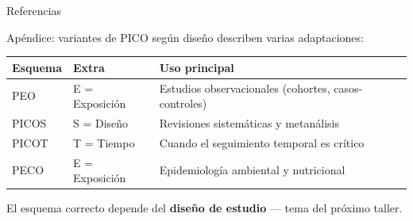 \documentclass[12pt, aspectratio=169]{beamer}
\begin{document}
\begin{frame}[allowframebreaks]{Referencias}
  \small
  \printbibliography[heading=none]
\end{frame}


\appendix

\begin{frame}{Apéndice: variantes de PICO según diseño}
  \textcite{Hosseini2024_formulating} describen varias adaptaciones:

  \medskip
  \begin{tabular}{@{}llp{}@{}}
    \toprule
    \textbf{Esquema} & \textbf{Extra} & \textbf{Uso principal} \\
    \midrule
    PEO   & E = Exposición & Estudios observacionales (cohortes, casos-controles) \\[4pt]
    PICOS & S = Diseño     & Revisiones sistemáticas y metanálisis \\[4pt]
    PICOT & T = Tiempo     & Cuando el seguimiento temporal es crítico \\[4pt]
    PECO  & E = Exposición & Epidemiología ambiental y nutricional \\
    \bottomrule
  \end{tabular}

  \medskip
  \begin{keybox}
    \small
    El esquema correcto depende del \textbf{diseño de estudio} — tema del próximo taller.
  \end{keybox}
\end{frame}

\end{document}
